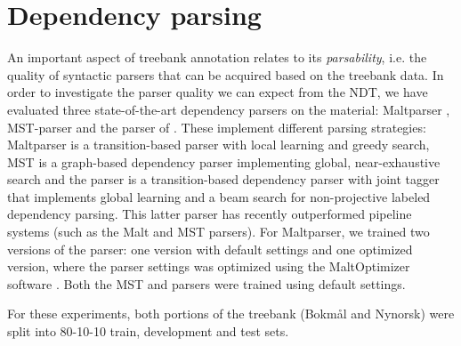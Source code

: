 \documentclass[10pt,a4paper]{article}
\begin{document}
\section{Dependency parsing}
An important aspect of treebank annotation relates to its \emph{parsability},
i.e. the quality of syntactic parsers that can be acquired based on
the treebank data.  In order to investigate the parser quality we can
expect from the NDT, we have evaluated three state-of-the-art dependency
parsers on the material: Maltparser \cite{Niv:Hal:Nil:06},
MST-parser \cite{McD:Per:Rib:Haj:05} and the parser of
. These implement different parsing strategies: Maltparser is a transition-based parser with local learning and greedy search, MST is a graph-based dependency parser implementing global, near-exhaustive search and the  parser is a transition-based dependency parser with joint tagger that
implements global learning and a beam search for non-projective labeled
dependency parsing. 
This latter parser has recently outperformed pipeline systems (such as the
Malt and MST parsers).
For Maltparser, we trained two versions of the
parser: one version with default settings and one optimized version,
where the parser settings was optimized using the MaltOptimizer
software \cite{Bal:Niv:12}. Both the MST and 
parsers were trained using default settings.

For these experiments, both portions of the treebank (Bokm{\aa}l and
Nynorsk) were split into 80-10-10 train, development and test sets.




\end{document}
